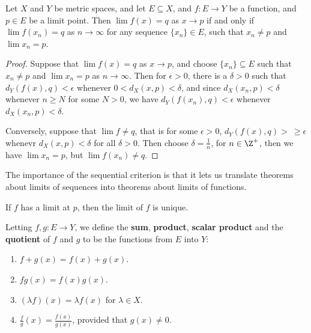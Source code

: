 \begin{theorem}\label{4.1.1}
    Let $X$ and  $Y$ be metric spaces, and let  $E \subseteq X$, and  $f:E \rightarrow Y$ be a function, 
    and  $p \in E$ be a limit point. Then  $\lim{f(x)}=q$ as  $x \rightarrow p$ if and only if 
    $\lim{f(x_n)}=q$ as  $n \rightarrow \infty$ for any sequence  $\{x_n\} \in E$, such 
    that  $x_n \neq p$ and  $\lim{x_n}=p$.
\end{theorem}
\begin{proof}
    Suppose that $\lim{f(x)}=q$ as  $x \rightarrow p$, and choose  $\{x_n\} \subseteq E$ such that 
    $x_n \neq p$ and  $\lim{x_n}=p$ as  $n \rightarrow \infty$. Then for  $\epsilon>0$, there is a  $\delta>0$ 
    such that  $d_Y(f(x),q)<\epsilon$ whenever  $0<d_X(x,p)<\delta$, and since  $d_X(x_n,p)<\delta$ 
    whenever $n \geq N$ for some  $N>0$, we have  $d_Y(f(x_n),q)<\epsilon$ whenever  $d_X(x_n,p)<\delta$. 

    Conversely, suppose that $\lim{f} \neq q$, that is for some  $\epsilon>0$,  $d_Y(f(x),q)>\ \geq \epsilon$ 
    whenevr  $d_X(x,p)<\delta$ for all  $\delta>0$. Then choose  $\delta=\frac{1}{n}$, for $n \in \Z^+$, 
    then we have $\lim{x_n}=p$, but  $\lim{f(x_n)} \neq q$.
\end{proof}

The importance of the sequential criterion is that it lets us translate theorems about limits 
of sequences into theorems about limits of functions.

\begin{corollary}
    If $f$ has a limit at  $p$, then the limit of  $f$ is unique.		
\end{corollary}

\begin{definition}
    Letting $f,g:E \rightarrow Y$, we define the  \textbf{sum}, \textbf{product}, \textbf{scalar product} and the 
    \textbf{quotient} of $f$ and  $g$ to be the functions from  $E$ into  $Y$:
         \begin{enumerate}[label=(\arabic*)]
             \item $f+g(x)=f(x)+g(x)$.

             \item $fg(x)=f(x)g(x)$.

             \item $(\lambda f)(x)=\lambda f(x)$ for $\lambda \in X$.

             \item $\frac{f}{g}(x)=\frac{f(x)}{g(x)}$, provided that $g(x) \neq 0$.
        \end{enumerate}
\end{definition}

